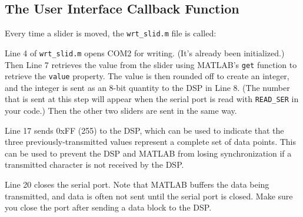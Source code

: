 \subsection{The User Interface Callback Function}

Every time a slider is moved, the \verb+wrt_slid.m+ file is called:

\setlength{\baselineskip}{0.4cm}
\setlength{\baselineskip}{0.5cm}

Line 4 of \verb+wrt_slid.m+ opens COM2 for writing. (It's already
been initialized.) Then Line 7 retrieves the value from the slider
using MATLAB's \verb+get+ function to retrieve the \verb+value+
property. The value is then rounded off to create an integer,
and the integer is sent as an 8-bit quantity to the DSP in Line 8.
(The number that is sent at this step will appear when the serial
port is read with \verb+READ_SER+ in your code.) Then the other
two sliders are sent in the same way.

Line 17 sends 0xFF (255) to the DSP, which can be used to indicate
that the three previously-transmitted values represent a complete set
of data points. This can be used to prevent the DSP and MATLAB from
losing synchronization if a transmitted character is not received by
the DSP.

Line 20 closes the serial port. Note that MATLAB buffers the data
being transmitted, and data is often not sent until the serial port
is closed. Make sure you close the port after sending a data block
to the DSP.